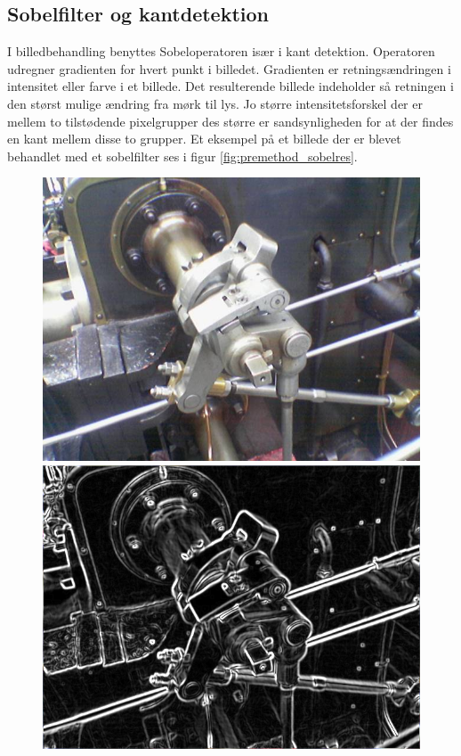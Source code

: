 \subsection{Sobelfilter og kantdetektion}
I billedbehandling benyttes Sobeloperatoren især i kant detektion\cite{edge}. Operatoren udregner gradienten for hvert punkt i billedet. Gradienten er retningsændringen i intensitet eller farve i et billede. Det resulterende billede indeholder så retningen i den størst mulige ændring fra mørk til lys. Jo større intensitetsforskel der er mellem to tilstødende pixelgrupper des større er sandsynligheden for at der findes en kant mellem disse to grupper\cite{imggrad}. Et eksempel på et billede der er blevet behandlet med et sobelfilter ses i figur \ref{fig:premethod_sobelres}.


\begin{figure}[H]
	\begin{minipage}[b]{0.5\linewidth}
		\centering
		\includegraphics[scale=0.25]{files/premethod/img/sobel1.PNG}
	\end{minipage}
	\hspace{0.5cm}
	\begin{minipage}[b]{0.5\linewidth}
		\centering
		\includegraphics[scale=0.25]{files/premethod/img/sobel2.PNG}

\end{minipage}
\end{figure}
